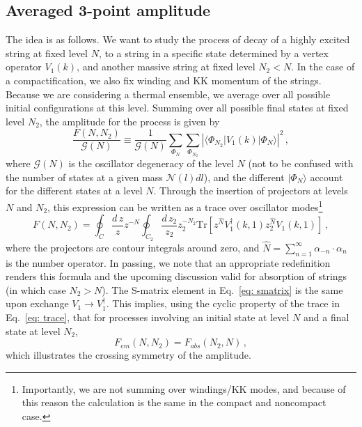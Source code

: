 \documentclass[a4paper,11pt]{article}
\begin{document}
\subsection{Averaged 3-point amplitude}

The idea is as follows. 
We want to study the process of decay of a highly excited string at fixed level $N$, to a string in a specific state determined by a vertex operator $V_1(k)$, and another massive string at fixed level $N_2<N$.
In the case of a compactification, we also fix winding and KK momentum of the strings.
Because we are considering a thermal ensemble, we average over all possible initial configurations at this level.
Summing over all possible final states at fixed level $N_2$, the amplitude for the process is given by
\begin{equation}\label{eq: smatrix}
    \frac{F(N,N_2)}{\mathcal{G}(N)}\equiv \frac{1}{\mathcal{G}(N)}\sum_{\Phi_N} \sum_{\Phi_{N_2}}|{\langle \Phi_{N_2} | V_1(k) | \Phi_{N}}\rangle |^2 \, , 
\end{equation}
where $\mathcal{G}(N)$ is the oscillator degeneracy of the level $N$ (not to be confused with the number of states at a given mass $\mathcal{N}(l)dl$), and the different $|\Phi_N\rangle$ account for the different states at a level $N$. 
Through the insertion of projectors at levels $N$ and $N_2$, this expression can be written as a trace over oscillator modes\footnote{Importantly, we are not summing over windings/KK modes, and because of this reason the calculation is the same in the compact and noncompact case.}
\begin{equation}\label{eq: trace}
    F(N,N_2) = \oint_C \frac{d\, z}{z}z^{-N} \oint_{C_2} \frac{d\, z_2}{z_2}z_2^{-N_2} \text{Tr} \left[z^{\hat{N}}V_1^\dag (k,1) z_2^{\hat N}V_1(k,1)\right] \, ,
\end{equation}
where the projectors are contour integrals around zero, and $\hat{N}=\sum_{n=1}^\infty{\alpha_{-n}\cdot \alpha_n}$ is the number operator. 
In passing, we note that an appropriate redefinition renders this formula and the upcoming discussion valid for absorption of strings (in which case $N_2>N$). 
The S-matrix element in Eq.~\eqref{eq: smatrix} is the same upon exchange $V_1 \rightarrow V_1^\dag$. 
This implies, using the cyclic property of the trace in Eq.~\eqref{eq: trace}, that for processes involving an initial state at level $N$ and a final state at level $N_2$, 
\begin{equation}
    F_{em}(N,N_2)=F_{abs}(N_2,N)\, ,
\end{equation}
which illustrates the crossing symmetry of the amplitude.
\\
\end{document}
